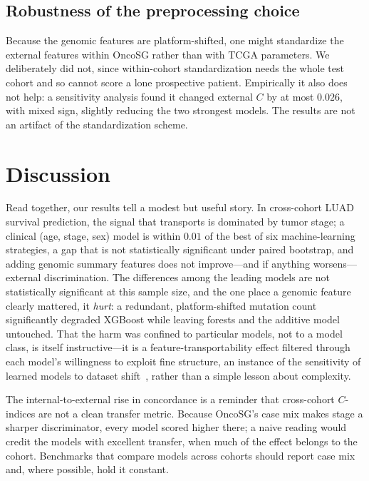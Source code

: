 \documentclass[journal]{IEEEtran}
\begin{document}
\subsection{Robustness of the preprocessing choice}
Because the genomic features are platform-shifted, one might standardize the
external features within OncoSG rather than with TCGA parameters. We deliberately
did not, since within-cohort standardization needs the whole test cohort and so
cannot score a lone prospective patient. Empirically it also does not help: a
sensitivity analysis found it changed external $C$ by at most $0.026$, with mixed
sign, slightly reducing the two strongest models. The results are not an artifact
of the standardization scheme.

\section{Discussion}
Read together, our results tell a modest but useful story. In cross-cohort LUAD
survival prediction, the signal that transports is dominated by tumor stage; a
clinical (age, stage, sex) model is within $0.01$ of the best of six
machine-learning strategies, a gap that is not statistically significant under
paired bootstrap, and adding genomic summary features does not improve---and if
anything worsens---external discrimination. The differences among the leading
models are not statistically significant at this sample size, and the one place
a genomic feature clearly mattered, it \emph{hurt}: a redundant, platform-shifted
mutation count significantly degraded XGBoost while leaving forests and the
additive model untouched. That the harm was confined to particular models, not
to a model class, is itself instructive---it is a feature-transportability
effect filtered through each model's willingness to exploit fine structure, an
instance of the sensitivity of learned models to dataset shift~\cite{moreno2012},
rather than a simple lesson about complexity.

The internal-to-external rise in concordance is a reminder that cross-cohort
$C$-indices are not a clean transfer metric. Because OncoSG's case mix makes
stage a sharper discriminator, every model scored higher there; a naive reading
would credit the models with excellent transfer, when much of the effect belongs
to the cohort. Benchmarks that compare models across cohorts should report case
mix and, where possible, hold it constant.
\end{document}
